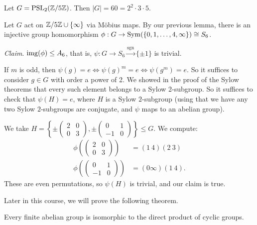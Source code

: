 \documentclass[a4paper]{scrreprt}
\begin{document}
\begin{example}
	Let $G = \operatorname{PSL}_2(\mathbb{Z}/5\mathbb{Z})$. Then $|G| = 60 = 2^2 \cdot 3 \cdot 5$.

	Let $G$ act on $\mathbb{Z}/5\mathbb{Z} \cup \{\infty\}$ via Möbius maps. By our previous lemma, there is an injective group homomorphism $\phi : G \rightarrow \operatorname{Sym}(\{0, 1, \dots, 4, \infty\}) \cong S_6$.

	\emph{Claim}. $\operatorname{img}(\phi) \leq A_6$, that is, $\psi: G \rightarrow S_6 \xrightarrow{\operatorname{sgn}} \{\pm 1\}$ is trivial.

	If $m$ is odd, then $\psi(g) = e \iff \psi(g)^m = e \iff \psi(g^m) = e$. So it suffices to consider $g \in G$ with order a power of 2. We showed in the proof of the Sylow theorems that every such element belongs to a Sylow 2-subgroup. So it suffices to check that $\psi(H) = e$, where $H$ is a Sylow $2$-subgroup (using that we have any two Sylow $2$-subgroups are conjugate, and $\psi$ maps to an abelian group). 

	We take $H =\left\{ \pm \begin{pmatrix}
		2 & 0 \\ 0 & 3
	\end{pmatrix},\pm \begin{pmatrix}
		0 & 1 \\ -1 & 0 
	\end{pmatrix} \right \} \leq G$. We compute:
	\begin{align*}
		\phi\left(\begin{pmatrix}
			2 & 0 \\ 0 & 3
		\end{pmatrix}\right) &= (1\ 4)(2\ 3)\\
		\phi\left(\begin{pmatrix}
		0 & 1 \\ -1 & 0
		\end{pmatrix}\right) &= (0 \infty)(1\ 4).
	\end{align*} 
	These are even permutations, so $\psi(H)$ is trivial, and our claim is true.
\end{example}


Later in this course, we will prove the following theorem.

\begin{theorem}
	Every finite abelian group is isomorphic to the direct product of cyclic groups.
\end{theorem}
\end{document}
